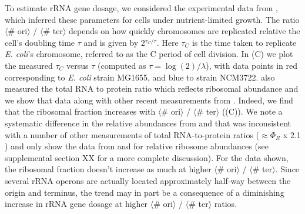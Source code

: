 To estimate rRNA gene dosage, we considered the experimental data
from \cite{si2017}, which inferred these parameters for cells under
nutrient-limited growth. The ratio $\langle$\# ori$\rangle$ / $\langle$\#
ter$\rangle$ depends on how quickly chromosomes are replicated relative the
cell's doubling time $\tau$ and is given by 2$^{\tau_C / \tau}$. Here $\tau_C$
is the time taken to replicate \textit{E. coli}'s chromosome, referred to as the
C period of cell division.  In (C) we plot the
measured $\tau_C$ versus $\tau$ (computed as $\tau = \log (2) / \lambda$), with
data points in red corresponding to \textit{E. coli} strain MG1655, and blue to
strain NCM3722. \cite{si2017} also measured the total RNA to protein ratio which
reflects ribosomal abundance and we show that data along with other recent
measurements from \cite{dai2016,dai2018}. Indeed, we find that the ribosomal
fraction increases with $\langle$\# ori$\rangle$ / $\langle$\# ter$\rangle$
((C)). We note a systematic difference in the
relative abundances from \cite{peebo2015} and \cite{valgepea2013} that was
inconsistent with a number of other measurements of total RNA-to-protein ratios
($\approx \Phi_R$ x 2.1 \cite{dai2016}) and only show the data from
\cite{schmidt2016} and \cite{li2014} for relative ribosome abundances (see
supplemental section XX for a more complete discussion). For the data shown, the
ribosomal fraction doesn't increase as much at higher $\langle$\# ori$\rangle$ /
$\langle$\# ter$\rangle$. Since several rRNA operons are actually located
approximately half-way between the origin and terminus, the trend may in part be
a consequence of a diminishing increase in rRNA gene dosage at higher
$\langle$\# ori$\rangle$ / $\langle$\# ter$\rangle$ ratios.





